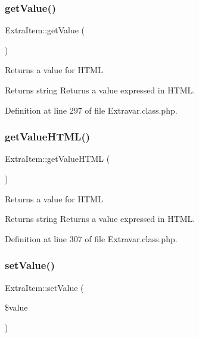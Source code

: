 \hypertarget{classExtraItem_a61ff542aa57144ac9e8d20d40f426486}{}\label{classExtraItem_a61ff542aa57144ac9e8d20d40f426486} 
\subsubsection{\texorpdfstring{get\+Value()}{getValue()}}
{\footnotesize\ttfamily Extra\+Item\+::get\+Value (\begin{DoxyParamCaption}{ }\end{DoxyParamCaption})}

Returns a value for H\+T\+ML

\begin{DoxyReturn}{Returns}
string Returns a value expressed in H\+T\+ML. 
\end{DoxyReturn}


Definition at line 297 of file Extravar.\+class.\+php.

\hypertarget{classExtraItem_a7784f081919e81e4a41ab0c250d6ca52}{}\label{classExtraItem_a7784f081919e81e4a41ab0c250d6ca52} 
\subsubsection{\texorpdfstring{get\+Value\+H\+T\+M\+L()}{getValueHTML()}}
{\footnotesize\ttfamily Extra\+Item\+::get\+Value\+H\+T\+ML (\begin{DoxyParamCaption}{ }\end{DoxyParamCaption})}

Returns a value for H\+T\+ML

\begin{DoxyReturn}{Returns}
string Returns a value expressed in H\+T\+ML. 
\end{DoxyReturn}


Definition at line 307 of file Extravar.\+class.\+php.

\hypertarget{classExtraItem_a6bec289dc0622bd882a36cb9b5680b03}{}\label{classExtraItem_a6bec289dc0622bd882a36cb9b5680b03} 
\subsubsection{\texorpdfstring{set\+Value()}{setValue()}}
{\footnotesize\ttfamily Extra\+Item\+::set\+Value (\begin{DoxyParamCaption}\item[{}]{\$value }\end{DoxyParamCaption})}

